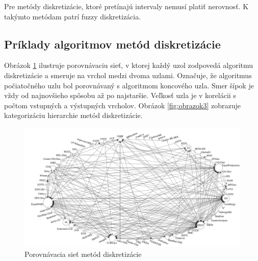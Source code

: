 Pre metódy diskretizácie, ktoré pretínajú intervaly nemusí platiť nerovnosť. K takýmto metódam patrí fuzzy diskretizácia. 

\subsection{Príklady algoritmov metód diskretizácie}


Obrázok  \ref{fig:obrazok2} ilustruje porovnávaciu sieť, v ktorej každý uzol zodpovedá algoritmu diskretizácie a smeruje na vrchol medzi dvoma uzlami. Označuje, že algoritmus počiatočného uzlu bol porovnávaný s algoritmom koncového uzla. Smer šípok je vždy od najnovšieho spôsobu až po najstaršie. Veľkosť uzla je v korelácii s počtom vstupných a výstupných vrcholov. \cite{Garcia2013} Obrázok \ref{fig:obrazok3} zobrazuje kategorizáciu hierarchie metód diskretizácie. 

\begin{figure}
	\centering
	\includegraphics[width=1\linewidth]{obrazky/obrazok2}
	\caption{Porovnávacia sieť metód diskretizácie}
	\label{fig:obrazok2}
\end{figure}

